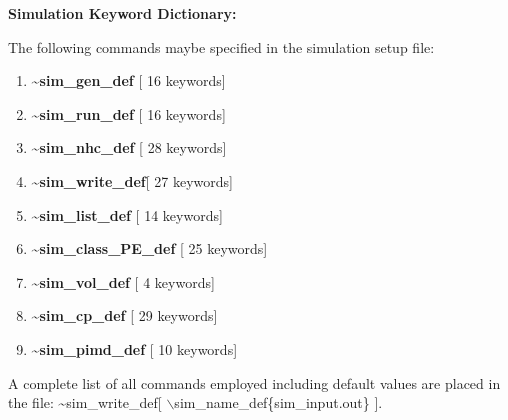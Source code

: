 \clearpage
\begin{center}
\huge
{\bf Simulation Keyword Dictionary: } 
\end{center}
\LARGE

The following commands maybe specified in the simulation setup file:
\begin{enumerate}
\LARGE
\item {\bf \~{}sim\_gen\_def} [ 16 keywords]
\item {\bf \~{}sim\_run\_def} [ 16 keywords]
\item {\bf \~{}sim\_nhc\_def} [ 28 keywords]
\item {\bf \~{}sim\_write\_def}[ 27 keywords]
\item {\bf \~{}sim\_list\_def} [ 14 keywords]
\item {\bf \~{}sim\_class\_PE\_def} [ 25 keywords]
\item {\bf \~{}sim\_vol\_def} [ 4 keywords]
\item {\bf \~{}sim\_cp\_def} [ 29 keywords]
\item {\bf \~{}sim\_pimd\_def} [ 10 keywords]
\end{enumerate}
\large
A complete list of all commands employed including default
values are placed in the file:
\~{}sim\_write\_def[ $\backslash$sim\_name\_def\{sim\_input.out\} ]. 


\clearpage


